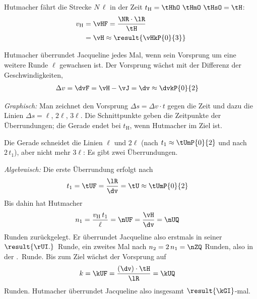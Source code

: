\begin{abcliste}
\abc Hutmacher fährt die Strecke $N\,\ell$ in der Zeit $t_\mathrm{H} = \tHhO\ \tHmO\ \tHsO = \tH$:
\begin{align}
 v_\mathrm{H} &= \vHF = \frac{\NR\cdot\lR}{\tH} \\
   &= \vH \approx \result{\vHkP{0}{3}}
\end{align}

\abc Hutmacher überrundet Jacqueline jedes Mal, wenn sein Vorsprung um eine weitere Runde $\ell$ gewachsen ist. Der Vorsprung wächst mit der Differenz der Geschwindigkeiten,
\begin{align}
 \Delta v &= \dvF = \vH-\vJ = \dv \approx \dvkP{0}{2}
\end{align}

\emph{Graphisch:} Man zeichnet den Vorsprung $\Delta s = \Delta v\cdot t$ gegen die Zeit und dazu die Linien $\Delta s = \ell$, $2\ell$, $3\ell$. Die Schnittpunkte geben die Zeitpunkte der Überrundungen; die Gerade endet bei $t_\mathrm{H}$, wenn Hutmacher im Ziel ist.

\begin{center}
\end{center}
Die Gerade schneidet die Linien $\ell$ und $2\ell$ (nach $t_1 \approx \tUmP{0}{2}$ und nach $2\,t_1$), aber nicht mehr $3\ell$: Es gibt zwei Überrundungen.

\emph{Algebraisch:} Die erste Überrundung erfolgt nach
\begin{align}
 t_1 &= \tUF = \frac{\lR}{\dv} = \tU \approx \tUmP{0}{2}
\end{align}
Bis dahin hat Hutmacher
\begin{align}
 n_1 &= \frac{v_\mathrm{H}\,t_1}{\ell} = \nUF = \frac{\vH}{\dv} = \nUQ
\end{align}
Runden zurückgelegt. Er überrundet Jacqueline also erstmals in seiner $\result{\rUI.}$~Runde, ein zweites Mal nach $n_2 = 2\,n_1 = \nZQ$ Runden, also in der \rZI.~Runde. Bis zum Ziel wächst der Vorsprung auf
\begin{align}
 k &= \kUF = \frac{\left(\dv\right)\cdot\tH}{\lR} = \kUQ
\end{align}
Runden. Hutmacher überrundet Jacqueline also insgesamt $\result{\kGI}$-mal.
\end{abcliste}
